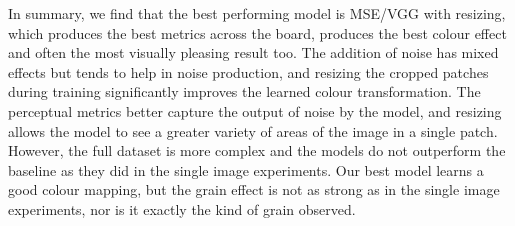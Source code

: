 
In summary, we find that the best performing model is MSE/VGG with resizing, which produces the best metrics across the board, produces the best colour effect and often the most visually pleasing result too. The addition of noise has mixed effects but tends to help in noise production, and resizing the cropped patches during training significantly improves the learned colour transformation. The perceptual metrics better capture the output of noise by the model, and resizing allows the model to see a greater variety of areas of the image in a single patch. However, the full dataset is more complex and the models do not outperform the baseline as they did in the single image experiments. Our best model learns a good colour mapping, but the grain effect is not as strong as in the single image experiments, nor is it exactly the kind of grain observed.



